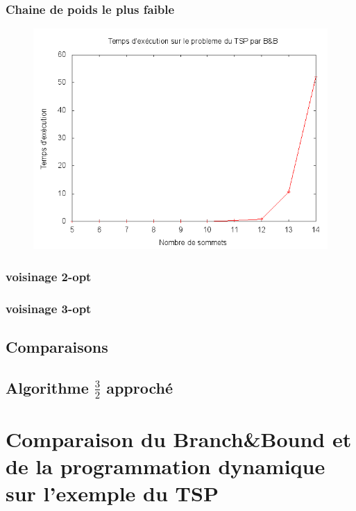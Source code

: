 \subsubsection{Chaine de poids le plus faible}
\begin{figure}[H]
	\includegraphics[width=\linewidth]{../pratique/branch_and_bound_dev/tsp_bb.png}
\end{figure}

\subsubsection{voisinage 2-opt}

\subsubsection{voisinage 3-opt}


\subsection{Comparaisons}


\subsection{Algorithme $\frac{3}{2}$ approché}



\section{Comparaison du Branch\&Bound et de la programmation dynamique sur l'exemple du TSP}


